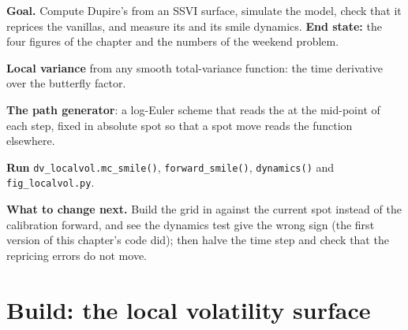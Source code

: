 \begin{tutorial}
\textbf{Goal.} Compute Dupire's  from an SSVI surface, simulate the model, check that it
reprices the vanillas, and measure its  and its smile dynamics. \textbf{End state:} the four figures
of the chapter and the numbers of the weekend problem.
\begin{tutsteps}
\item \textbf{Local variance} from any smooth total-variance function: the time derivative over the butterfly
factor.
\label{lst:dv:local-volatility:dupire}
\item \textbf{The path generator}: a log-Euler scheme that reads the  at the mid-point of each
step, fixed in absolute spot so that a spot move reads the function elsewhere.
\label{lst:dv:local-volatility:sim}
\item \textbf{Run} \texttt{dv\_localvol.mc\_smile()}, \texttt{forward\_smile()}, \texttt{dynamics()} and
\texttt{fig\_localvol.py}.
\end{tutsteps}
\textbf{What to change next.} Build the  grid in  against the current spot instead of
the calibration forward, and see the dynamics test give the wrong sign (the first version of this chapter's code
did); then halve the time step and check that the repricing errors do not move.
\end{tutorial}

\section{Build: the local volatility surface}\label{bld:dv:local-volatility:localvol}

